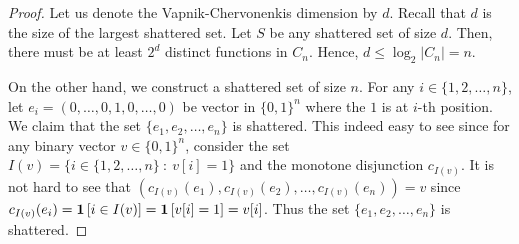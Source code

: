 \begin{proof}
Let us denote the Vapnik-Chervonenkis dimension by $d$. Recall that $d$ is the
size of the largest shattered set. Let $S$ be any shattered set of size $d$.
Then, there must be at least $2^d$ distinct functions in $C_n$. Hence, $d \le
\log_2 |C_n| = n$.

On the other hand, we construct a shattered set of size $n$. For any $i \in
\{1,2,\dots,n\}$, let $e_i = (0, \dots, 0, 1, 0, \dots, 0)$ be vector in
$\{0,1\}^n$ where the $1$ is at $i$-th position. We claim that the set $\{e_1,
e_2, \dots, e_n\}$ is shattered. This indeed easy to see since for any binary
vector $v \in \{0,1\}^n$, consider the set $I(v) = \{ i \in \{1,2,\dots,n\} ~:~
v[i] = 1 \}$ and the monotone disjunction $c_{I(v)}$. It is not hard to see that
$(c_{I(v)}(e_1), c_{I(v)}(e_2), \dots, c_{I(v)}(e_n)) = v$ since $c_{I(v)}(e_i) =
\mathbf{1}\left[{i \in I(v)}\right] = \mathbf{1}\left[{v[i] = 1}\right] = v[i]$. Thus the set
$\{e_1, e_2, \dots, e_n\}$ is shattered.
\end{proof}
